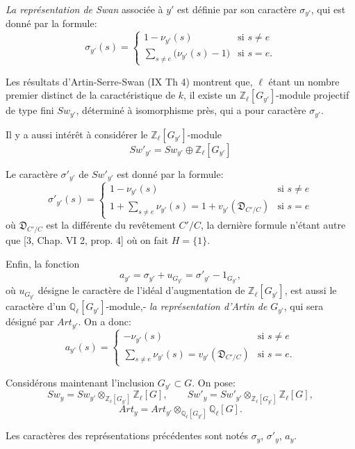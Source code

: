 \documentclass[11pt]{article}
\begin{document}
\emph{La représentation de Swan} associée à $y'$ est définie par son caractère $\sigma_{y'}$, qui est donné par la formule:
\[
\sigma_{y'}(s)=
\begin{cases}
1-\nu_{y'}(s)& \text{si } s\ne e\\[0.4em]
\displaystyle\sum_{s\ne e}\bigl(\nu_{y'}(s)-1\bigr)& \text{si } s=e.
\end{cases}
\tag{4.2.2}
\]

Les résultats d'Artin-Serre-Swan (IX Th 4) montrent que, $\ell$ étant un nombre premier distinct de la caractéristique de $k$, il existe un $\mathbb Z_\ell[G_{y'}]$-module projectif de type fini $Sw_{y'}$, déterminé à isomorphisme près, qui a pour caractère $\sigma_{y'}$.

Il y a aussi intérêt à considérer le $\mathbb Z_\ell[G_{y'}]$-module
\[
Sw'_{y'}=Sw_{y'}\oplus\mathbb Z_\ell[G_{y'}]
\tag{4.2.3}
\]

Le caractère $\sigma'_{y'}$ de $Sw'_{y'}$ est donné par la formule:
\[
\sigma'_{y'}(s)=
\begin{cases}
1-\nu_{y'}(s)& \text{si } s\ne e\\[0.4em]
\displaystyle 1+\sum_{s\ne e}\nu_{y'}(s)
=1+v_{y'}(\mathfrak D_{C'/C})& \text{si } s=e
\end{cases}
\tag{4.2.4}
\]
où $\mathfrak D_{C'/C}$ est la différente du
revêtement $C'/C$, la dernière formule n'étant autre que [3, Chap. VI 2, prop. 4] où on fait $H=\{1\}$.

Enfin, la fonction
\[
a_{y'}=\sigma_{y'}+u_{G_{y'}}=\sigma'_{y'}-1_{G_{y'}},
\tag{4.2.5}
\]
où $u_{G_{y'}}$ désigne le caractère de l'idéal d'augmentation de $\mathbb Z_\ell[G_{y'}]$, est aussi le caractère d'un $\mathbb Q_\ell[G_{y'}]$-module,- \emph{la représentation d'Artin de} $G_{y'}$, qui sera désigné par $Art_{y'}$.
On a donc:
\[
a_{y'}(s)=
\begin{cases}
-\nu_{y'}(s)& \text{si } s\ne e\\[0.4em]
\displaystyle\sum_{s\ne e}\nu_{y'}(s)=v_{y'}(\mathfrak D_{C'/C})& \text{si } s=e.
\end{cases}
\tag{4.2.6}
\]

Considérons maintenant l'inclusion $G_{y'}\subset G$. On pose:
\[
Sw_y=Sw_{y'}\otimes_{\mathbb Z_\ell[G_{y'}]}\mathbb Z_\ell[G],
\qquad
Sw'_y=Sw'_{y'}\otimes_{\mathbb Z_\ell[G_{y'}]}\mathbb Z_\ell[G],
\tag{4.2.7}
\]
\[
Art_y=Art_{y'}\otimes_{\mathbb Q_\ell[G_{y'}]}\mathbb Q_\ell[G].
\tag{4.2.8}
\]

Les caractères des représentations précédentes sont notés $\sigma_y$, $\sigma'_y$, $a_y$.
\end{document}
